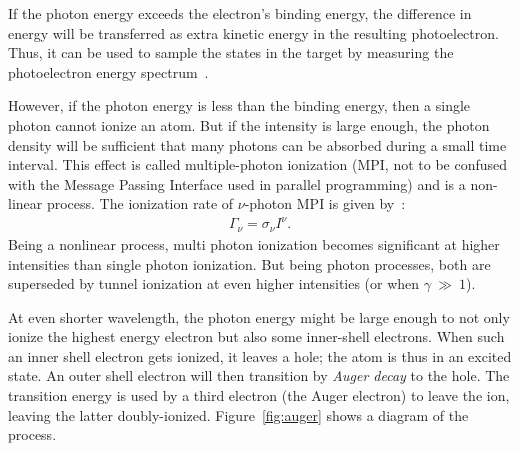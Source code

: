 If the photon energy exceeds the electron's binding energy, the difference in energy
will be transferred as extra kinetic energy in the
resulting photoelectron. Thus, it can be used to sample the states in the
target by measuring the photoelectron energy spectrum~\cite{Fennel2010}.

However, if the photon energy is less than the binding energy, then a single
photon cannot ionize an atom. But if the intensity is large enough, the
photon density will be sufficient that many photons can be absorbed during a
small time interval.
This effect is called multiple-photon ionization (MPI, not to
be confused with the Message Passing Interface used in parallel programming) and
is a non-linear process. The ionization rate of $\nu$-photon MPI is given
by~\cite{Fennel2010}:
\begin{align}
\Gamma_{\nu} = \sigma_{\nu} I^{\nu}.
\label{eqn:ionization:rate:mpi}
\end{align}
Being a nonlinear process, multi photon ionization becomes significant at higher
intensities than single photon ionization. But being photon processes, both are
superseded by tunnel ionization at even higher intensities (or when
$\gamma~\gg~1$).


{}

At even shorter wavelength, the photon energy might be large enough to not only
ionize the highest energy electron but also some inner-shell electrons.
When such an inner shell electron gets ionized, it leaves a hole; the atom is
thus in an excited state. An outer shell electron will then transition by
\textit{Auger decay} to the hole. The transition energy is used by a third
electron (the Auger electron) to leave the ion, leaving the latter
doubly-ionized. Figure~\ref{fig:auger} shows a diagram of the process.

